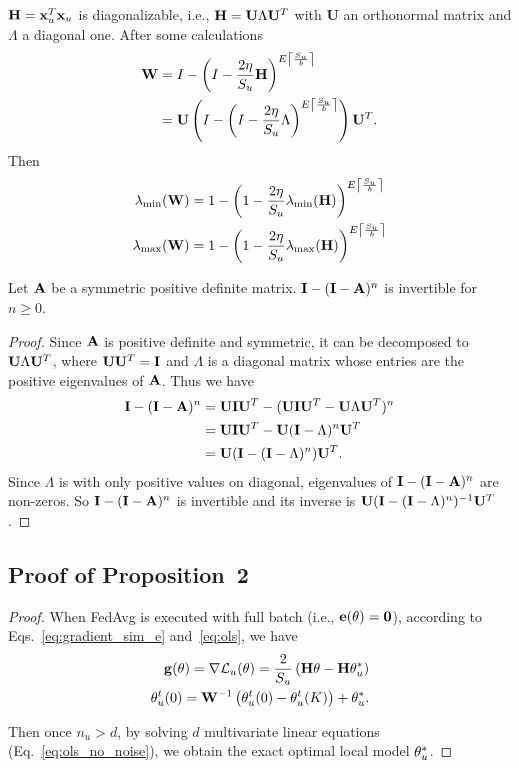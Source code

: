 $\mathbf{H}={\mathbf{x}}_u^{T} {\mathbf{x}}_u$ is diagonalizable, i.e., $\mathbf{H}=\mathbf{U} \Lambda \mathbf{U}^{T}$ with $\mathbf{U}$ an orthonormal matrix and $\Lambda$ a diagonal one. After some calculations
$$
\begin{aligned}
\mathbf{W} & =I-\left(I-\frac{2 \eta}{S_u} \mathbf{H}\right)^{E \left\lceil\frac{S_u}{b}\right\rceil} \\
& =\mathbf{U}\left(I-\left(I-\frac{2 \eta}{S_u} \Lambda\right)^{E \left\lceil\frac{S_u}{b}\right\rceil}\right) \mathbf{U}^{T}.
\end{aligned}
$$
Then 
$$
\begin{aligned}
\lambda_{\min}(\mathbf{W}) &=1-\left(1-\frac{2 \eta}{S_u} \lambda_{\min}(\mathbf{H})\right)^{E \left\lceil\frac{S_u}{b}\right\rceil}\\ 
\lambda_{\max}(\mathbf{W}) &=1-\left(1-\frac{2 \eta}{S_u} \lambda_{\max}(\mathbf{H})\right)^{E \left\lceil\frac{S_u}{b}\right\rceil}
\end{aligned}
$$

\begin{lemma}\label{lem:invert}
Let $\mathbf{A}$ be a symmetric positive definite matrix. $\mathbf{I} - (\mathbf{I}-\mathbf{A})^n$ is invertible for $n\geq 0$.
\end{lemma}

\begin{proof}
Since $\mathbf{A}$ is positive definite and symmetric, it can be decomposed to $\mathbf{U}\Lambda\mathbf{U}^T$, where $\mathbf{U}\mathbf{U}^T = \mathbf{I}$ and $\Lambda$ is a diagonal matrix whose entries are the positive eigenvalues of $\mathbf{A}$. Thus we have
\begin{align*}
    \mathbf{I}-(\mathbf{I}-\mathbf{A})^n &= \mathbf{U}\mathbf{I}\mathbf{U}^T - (\mathbf{U}\mathbf{I}\mathbf{U}^T - \mathbf{U}\Lambda\mathbf{U}^T)^n \\
    & =\mathbf{U}\mathbf{I}\mathbf{U}^T - \mathbf{U}(\mathbf{I} -\Lambda)^n\mathbf{U}^T\\
    &= \mathbf{U} (\mathbf{I}-(\mathbf{I}-\Lambda)^n)\mathbf{U}^T.
\end{align*}
Since $\Lambda$ is with only positive values on diagonal, eigenvalues of $\mathbf{I}-(\mathbf{I}-\mathbf{A})^n$ are non-zeros. So  $\mathbf{I}-(\mathbf{I}-\mathbf{A})^n$ is invertible and its inverse is $\mathbf{U} (\mathbf{I}-(\mathbf{I}-\Lambda)^n)^{-1}\mathbf{U}^T$.
\end{proof}


\subsection{Proof of Proposition~2}\label{app:proof_corollary}
\begin{proof}
When FedAvg is executed with full batch (i.e., $\mathbf{e}(\theta) = \mathbf{0}$), according to Eqs.~\ref{eq:gradient_sim_e} and~\ref{eq:ols}, we have
\begin{align}
        \mathbf{g}(\theta) =  \nabla {\ensuremath{\mathcal{L}}_u}(\theta)= \frac{2}{S_u}\left( \mathbf{H} \theta - \mathbf{H}\theta_u^* \right) \nonumber \\ 
          \theta_u^t(0) =\mathbf{W}^{-1}\left(  \theta_u^t(0)-\theta_u^t(K)\right) + \theta_u^*. \label{eq:ols_no_noise}
\end{align}

Then once $n_u>d$, by solving $d$ multivariate linear equations (Eq.~\ref{eq:ols_no_noise}), we obtain the exact optimal local model $\theta_u^*$. 
\end{proof}

